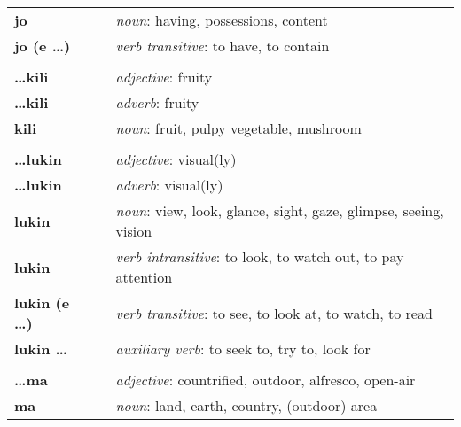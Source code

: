 \begin{supertabular}{p{2,5cm}|ll}
    \textbf{jo}               &  & \textit{noun}: having, possessions, content                                             \\
    \textbf{jo (e \dots)}     &  & \textit{verb transitive}: to have, to contain                                           \\
                              &  &                                                                                         \\
    \textbf{\dots kili}       &  & \textit{adjective}: fruity                                                              \\
    \textbf{\dots kili}       &  & \textit{adverb}: fruity                                                                 \\
    \textbf{kili}             &  & \textit{noun}: fruit, pulpy vegetable, mushroom                                         \\
                              &  &                                                                                         \\
    \textbf{\dots lukin}      &  & \textit{adjective}: visual(ly)                                                          \\
    \textbf{\dots lukin}      &  & \textit{adverb}: visual(ly)                                                             \\
    \textbf{lukin}            &  & \textit{noun}: view, look, glance, sight, gaze, glimpse, seeing, vision                 \\
    \textbf{lukin}            &  & \textit{verb intransitive}: to look, to watch out, to pay attention                     \\
    \textbf{lukin (e \dots)}  &  & \textit{verb transitive}: to see, to look at, to watch, to read                         \\
    \textbf{lukin \dots}      &  & \textit{auxiliary verb}: to seek to, try to, look for                                   \\
                              &  &                                                                                         \\
    \textbf{\dots ma}         &  & \textit{adjective}: countrified, outdoor, alfresco, open-air                            \\
    \textbf{ma}               &  & \textit{noun}: land, earth, country, (outdoor) area                                     \\

\end{supertabular}
